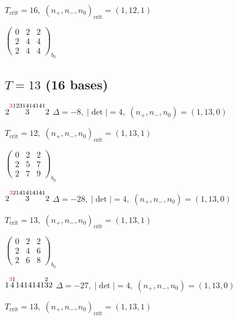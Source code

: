 \documentclass[10pt]{article}
\begin{document}
\hspace{1em}$T_{\text{crit}}=16,\; (n_+,n_-,n_0)_{\text{crit}}=(1,12,1)$

\hspace{2em}$\left(\begin{smallmatrix}0 & 2 & 2 \\ 2 & 4 & 4 \\ 2 & 4 & 4\end{smallmatrix}\right)_{\!b_0}$


\subsection*{$T = 13$ \quad (16 bases)}
\smallskip

$2\overset{\textcolor{red}{3}1231414141}{3}2$ \quad $\Delta=-8,\; |\det|=4,\; (n_+,n_-,n_0)=(1,13,0)$

\hspace{1em}$T_{\text{crit}}=12,\; (n_+,n_-,n_0)_{\text{crit}}=(1,13,1)$

\hspace{2em}$\left(\begin{smallmatrix}0 & 2 & 2 \\ 2 & 5 & 7 \\ 2 & 7 & 9\end{smallmatrix}\right)_{\!b_0}$

\smallskip

$2\overset{\textcolor{red}{3}2141414141}{3}2$ \quad $\Delta=-28,\; |\det|=4,\; (n_+,n_-,n_0)=(1,13,0)$

\hspace{1em}$T_{\text{crit}}=13,\; (n_+,n_-,n_0)_{\text{crit}}=(1,13,1)$

\hspace{2em}$\left(\begin{smallmatrix}0 & 2 & 2 \\ 2 & 4 & 6 \\ 2 & 6 & 8\end{smallmatrix}\right)_{\!b_0}$

\smallskip

$1\overset{\textcolor{red}{3}1}{4}1414141\overset{2}{3}2$ \quad $\Delta=-27,\; |\det|=4,\; (n_+,n_-,n_0)=(1,13,0)$

\hspace{1em}$T_{\text{crit}}=13,\; (n_+,n_-,n_0)_{\text{crit}}=(1,13,1)$
\end{document}

